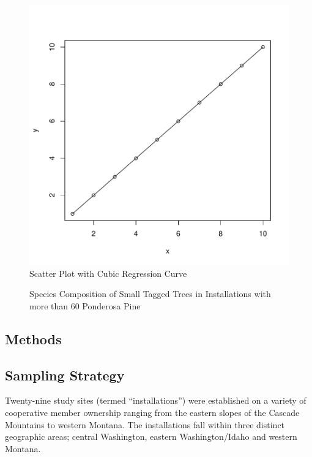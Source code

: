 \documentclass[11pt, letterpaper, fleqn]{article}
\begin{document}
\begin{figure}
\begin{center}
\includegraphics{Thesis_doc-fig2}
\end{center}
\caption{Scatter Plot with Cubic Regression Curve}
\end{figure}


\begin{figure}[h]
\begin{center}
\end{center}
\caption{Species Composition of Small Tagged Trees in Installations with more than 60 Ponderosa Pine}
\label{fig:spec_comp}
\end{figure}

\newpage
\clearpage
\begin{center}
\section{Methods}
\end{center}
\normalsize
\subsection{Sampling Strategy}
\doublespacing
Twenty-nine study sites (termed ``installations'') were established on a variety of cooperative member ownership ranging from the eastern slopes of the Cascade Mountains to western Montana. The installations fall within three distinct geographic areas; central Washington, eastern Washington/Idaho and western Montana. \\[4pt]
\end{document}
